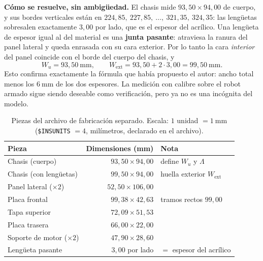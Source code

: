 \documentclass[11pt,a4paper]{article}
\begin{document}
\begin{tcolorbox}[colback=black!3,colframe=black!50,boxrule=0.5pt,arc=1pt]
\textbf{Cómo se resuelve, sin ambigüedad.} El chasis mide $93{,}50 \times 94{,}00$ de
cuerpo, y sus bordes verticales están en $224{,}85,\ 227{,}85,\ \dots,\ 321{,}35,\ 324{,}35$:
las lengüetas sobresalen exactamente $3{,}00$ por lado, que es el espesor del acrílico.
Una lengüeta de espesor igual al del material es una \textbf{junta pasante}: atraviesa la
ranura del panel lateral y queda enrasada con su cara exterior. Por lo tanto la cara
\emph{interior} del panel coincide con el borde del cuerpo del chasis, y
\[
  W_u = 93{,}50\ \mathrm{mm}, \qquad
  W_{\mathrm{ext}} = 93{,}50 + 2\cdot 3{,}00 = 99{,}50\ \mathrm{mm}.
\]
Esto confirma exactamente la fórmula que había propuesto el autor: ancho total menos los
$6\ \mathrm{mm}$ de los dos espesores. La medición con calibre sobre el robot armado
sigue siendo deseable como verificación, pero ya no es una incógnita del modelo.
\end{tcolorbox}

\begin{table}[htbp]
\centering
\small
\caption{Piezas del archivo de fabricación separado. Escala: $1$ unidad $= 1\ \mathrm{mm}$
(\texttt{\$INSUNITS} $=4$, milímetros, declarado en el archivo).}
\begin{tabular}{lrl}
\toprule
Pieza & Dimensiones (mm) & Nota \\
\midrule
Chasis (cuerpo) & $93{,}50 \times 94{,}00$ & define $W_u$ y $\Lambda$ \\
Chasis (con lengüetas) & $99{,}50 \times 94{,}00$ & huella exterior $W_{\mathrm{ext}}$ \\
Panel lateral (${\times}2$) & $52{,}50 \times 106{,}00$ & \\
Placa frontal & $99{,}38 \times 42{,}63$ & tramos rectos $99{,}00$ \\
Tapa superior & $72{,}09 \times 51{,}53$ & \\
Placa trasera & $66{,}00 \times 22{,}00$ & \\
Soporte de motor (${\times}2$) & $47{,}90 \times 28{,}60$ & \\
Lengüeta pasante & $3{,}00$ por lado & $=$ espesor del acrílico \\
\bottomrule
\end{tabular}
\end{table}
\end{document}
